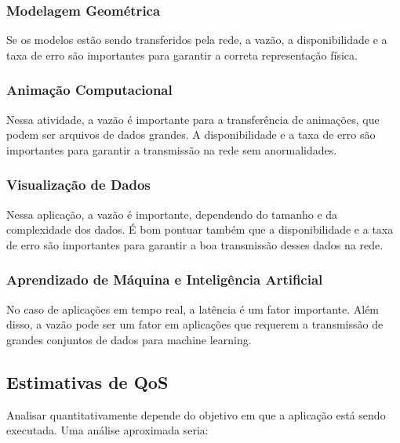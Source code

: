 \subsubsection{Modelagem Geométrica}

Se os modelos estão sendo transferidos pela rede, a vazão, a disponibilidade e a taxa de erro são importantes para garantir a correta representação física.

\subsubsection{Animação Computacional}

Nessa atividade, a vazão é importante para a transferência de animações, que podem ser arquivos de dados grandes. A disponibilidade e a taxa de erro são importantes para garantir a transmissão na rede sem anormalidades.

\subsubsection{Visualização de Dados}

Nessa aplicação, a vazão é importante, dependendo do tamanho e da complexidade dos dados. É bom pontuar também que a disponibilidade e a taxa de erro são importantes para garantir a boa transmissão desses dados na rede.

\subsubsection{Aprendizado de Máquina e Inteligência Artificial}

No caso de aplicações em tempo real, a latência é um fator importante. Além disso, a vazão pode ser um fator em aplicações que requerem a transmissão de grandes conjuntos de dados para machine learning.

\newpage
\subsection{Estimativas de QoS}

Analisar quantitativamente depende do objetivo em que a aplicação está sendo executada.
Uma análise aproximada seria:

